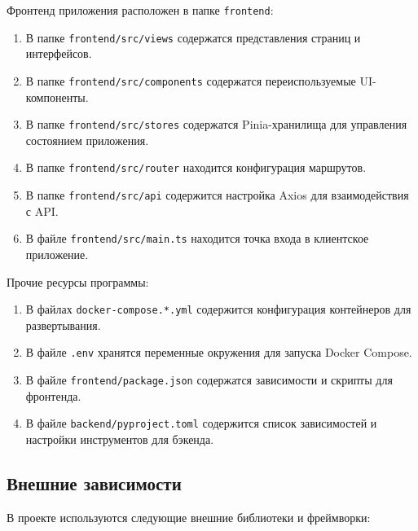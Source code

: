 \documentclass[a4paper,12pt,reqno]{article}
\begin{document}
    Фронтенд приложения расположен в папке \texttt{frontend}:

    \begin{enumerate}
        \item В папке \texttt{frontend/src/views} содержатся представления страниц и интерфейсов.
        \item В папке \texttt{frontend/src/components} содержатся переиспользуемые UI-компоненты.
        \item В папке \texttt{frontend/src/stores} содержатся Pinia-хранилища для управления состоянием приложения.
        \item В папке \texttt{frontend/src/router} находится конфигурация маршрутов.
        \item В папке \texttt{frontend/src/api} содержится настройка Axios для взаимодействия с API.
        \item В файле \texttt{frontend/src/main.ts} находится точка входа в клиентское приложение.
    \end{enumerate}

    Прочие ресурсы программы:

    \begin{enumerate}
        \item В файлах \texttt{docker-compose.*.yml} содержится конфигурация контейнеров для развертывания.
        \item В файле \texttt{.env} хранятся переменные окружения для запуска Docker Compose.
        \item В файле \texttt{frontend/package.json} содержатся зависимости и скрипты для фронтенда.
        \item В файле \texttt{backend/pyproject.toml} содержится список зависимостей и настройки инструментов для бэкенда.
    \end{enumerate}
    
    \newpage
    
    \subsection*{Внешние зависимости}
    
    В проекте используются следующие внешние библиотеки и фреймворки:
    
\end{document}
